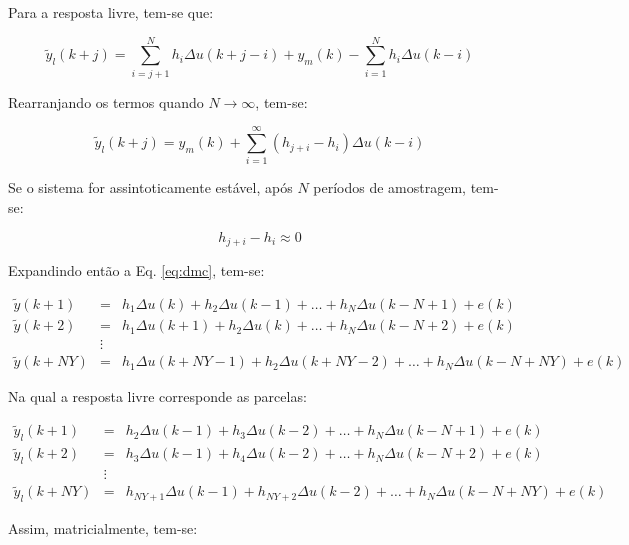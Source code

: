 Para a resposta livre, tem-se que:

\begin{equation*}
\tilde{y}_l(k+j) = \sum_{i=j+1}^N h_i\Delta u(k+j-i) + y_m(k) - 
                   \sum_{i=1}^N h_i\Delta u(k-i)
\end{equation*}

Rearranjando os termos quando $N \rightarrow \infty$, tem-se:

\begin{equation}\label{eq:resp_livre}
\tilde{y}_l(k+j) = y_m(k) + \sum_{i=1}^\infty (h_{j+i}-h_i)\Delta u(k-i)
\end{equation}

Se o sistema for assintoticamente estável, após $N$ períodos de amostragem,
tem-se:

\begin{equation*}
h_{j+i} - h_i \approx 0
\end{equation*}

Expandindo então a Eq. \ref{eq:dmc}, tem-se:

\begin{eqnarray}
\tilde{y}(k+1)  & = & h_1\Delta u(k) + h_2\Delta u(k-1) + \ldots + h_N\Delta
                      u(k-N+1) + e(k)\nonumber\\
\tilde{y}(k+2)  & = & h_1\Delta u(k+1) + h_2\Delta u(k) + \ldots + h_N\Delta
                      u(k-N+2) + e(k)\nonumber\\
& \vdots & \nonumber\\
\tilde{y}(k+NY) & = & h_1\Delta u(k+NY-1) + h_2\Delta u(k+NY-2) + \ldots + 
                      h_N\Delta u(k-N+NY) + e(k)\nonumber
\end{eqnarray}

Na qual a resposta livre corresponde as parcelas:

\begin{eqnarray}
\tilde{y}_l(k+1)  & = & h_2\Delta u(k-1) + h_3\Delta u(k-2) + \ldots +
                        h_N\Delta u(k-N+1) + e(k)\nonumber\\
\tilde{y}_l(k+2)  & = & h_3\Delta u(k-1) + h_4\Delta u(k-2) + \ldots +
                        h_N\Delta u(k-N+2) + e(k)\nonumber\\
& \vdots & \nonumber\\
\tilde{y}_l(k+NY) & = & h_{NY+1}\Delta u(k-1) + h_{NY+2}\Delta u(k-2) + 
                        \ldots + h_N\Delta u(k-N+NY) + e(k)\nonumber
\end{eqnarray}

Assim, matricialmente, tem-se:

